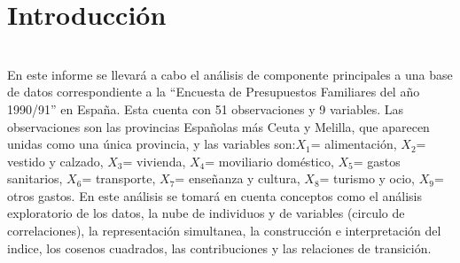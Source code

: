 \documentclass[report,oneside]{revcoles}
\begin{document}
\section{Introducción}
~\\En este informe se llevará a cabo el análisis de componente principales a una base de datos correspondiente a la ``Encuesta de Presupuestos Familiares del año 1990/91'' en España. Esta cuenta con 51 observaciones y 9 variables. Las observaciones son las provincias Españolas más Ceuta y Melilla, que aparecen unidas como una única provincia, y las variables son:$X_1$= alimentación, $X_2$= vestido y calzado, $X_3$= vivienda, $X_4$= moviliario doméstico, $X_5$= gastos sanitarios, $X_6$= transporte, $X_7$= enseñanza y cultura, $X_8$= turismo y ocio, $X_9$= otros gastos. En este análisis se tomará en cuenta conceptos como el análisis exploratorio de los datos, la nube de individuos y de variables (circulo de correlaciones), la representación simultanea, la construcción e interpretación del indice, los cosenos cuadrados, las contribuciones y las relaciones de transición.
\end{document}
